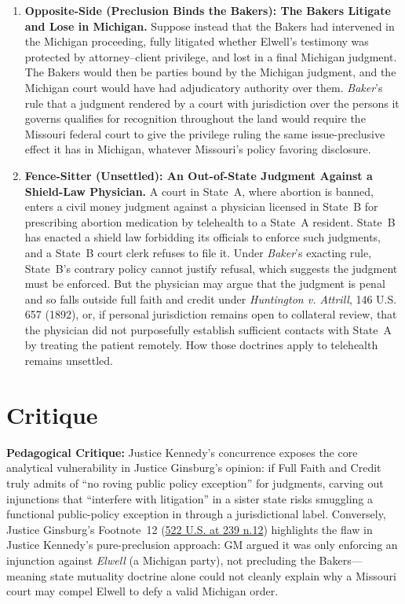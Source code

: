 \documentclass[12pt]{article}
\begin{document}
\begin{enumerate}
\item \textbf{Opposite-Side (Preclusion Binds the Bakers): The Bakers Litigate and Lose in Michigan.} Suppose instead that the Bakers had intervened in the Michigan proceeding, fully litigated whether Elwell's testimony was protected by attorney--client privilege, and lost in a final Michigan judgment. The Bakers would then be parties bound by the Michigan judgment, and the Michigan court would have had adjudicatory authority over them. \textit{Baker}'s rule that a judgment rendered by a court with jurisdiction over the persons it governs qualifies for recognition throughout the land would require the Missouri federal court to give the privilege ruling the same issue-preclusive effect it has in Michigan, whatever Missouri's policy favoring disclosure.

\item \textbf{Fence-Sitter (Unsettled): An Out-of-State Judgment Against a Shield-Law Physician.} A court in State~A, where abortion is banned, enters a civil money judgment against a physician licensed in State~B for prescribing abortion medication by telehealth to a State~A resident. State~B has enacted a shield law forbidding its officials to enforce such judgments, and a State~B court clerk refuses to file it. Under \textit{Baker}'s exacting rule, State~B's contrary policy cannot justify refusal, which suggests the judgment must be enforced. But the physician may argue that the judgment is penal and so falls outside full faith and credit under \textit{Huntington v. Attrill}, 146 U.S. 657 (1892), or, if personal jurisdiction remains open to collateral review, that the physician did not purposefully establish sufficient contacts with State~A by treating the patient remotely. How those doctrines apply to telehealth remains unsettled.

\end{enumerate}

\section{Critique}
\textbf{Pedagogical Critique:} Justice Kennedy's concurrence exposes the core analytical vulnerability in Justice Ginsburg's opinion: if Full Faith and Credit truly admits of ``no roving public policy exception'' for judgments, carving out injunctions that ``interfere with litigation'' in a sister state risks smuggling a functional public-policy exception in through a jurisdictional label. Conversely, Justice Ginsburg's Footnote~12 (\href{https://www.law.cornell.edu/supct/html/96-653.ZO.html}{522 U.S. at 239 n.12}) highlights the flaw in Justice Kennedy's pure-preclusion approach: GM argued it was only enforcing an injunction against \textit{Elwell} (a Michigan party), not precluding the Bakers---meaning state mutuality doctrine alone could not cleanly explain why a Missouri court may compel Elwell to defy a valid Michigan order.
\end{document}
